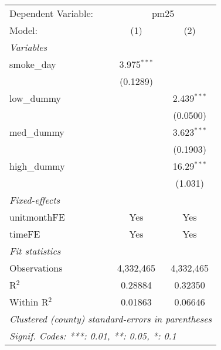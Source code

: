 
\begin{tabular}{lcc}
\tabularnewline\midrule\midrule
Dependent Variable: & \multicolumn{2}{c}{pm25}\\
Model: & (1) & (2)\\
\midrule \emph{Variables} &   &  \\
smoke\_day & 3.975$^{***}$ &   \\
  & (0.1289) &   \\
low\_dummy &    & 2.439$^{***}$\\
  &    & (0.0500)\\
med\_dummy &    & 3.623$^{***}$\\
  &    & (0.1903)\\
high\_dummy &    & 16.29$^{***}$\\
  &    & (1.031)\\
\midrule \emph{Fixed-effects} &   &  \\
unitmonthFE & Yes & Yes\\
timeFE & Yes & Yes\\
\midrule \emph{Fit statistics} &   &  \\
Observations & 4,332,465 & 4,332,465\\
R$^2$ & 0.28884 & 0.32350\\
Within R$^2$ & 0.01863 & 0.06646\\
\midrule\midrule\multicolumn{3}{l}{\emph{Clustered (county) standard-errors in parentheses}}\\
\multicolumn{3}{l}{\emph{Signif. Codes: ***: 0.01, **: 0.05, *: 0.1}}\\
\end{tabular}


